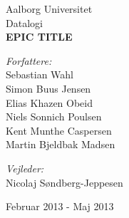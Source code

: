\begin{titlingpage}
\color{fpcolor}
\centering
\vspace*{1.0cm}

\LARGE Aalborg Universitet\\[0.75cm]
\Large Datalogi\\[1.75cm]

\vspace{2.0cm}
{ \fontsize{26.2pt}{26.2pt} \bfseries EPIC TITLE}
\vspace{0.5cm}
\vspace{0.75cm}

\begin{minipage}{13.37cm}
  \begin{flushleft} \large
    \vspace{0pt}
    \emph{Forfattere:}\\
    Sebastian Wahl\\
    Simon Buus Jensen\\
    Elias Khazen Obeid\\
    Niels Sonnich Poulsen\\
    Kent Munthe Caspersen\\
    Martin Bjeldbak Madsen\\
  \end{flushleft}

  \begin{flushright} \large
    \vspace{-112pt}
    \emph{Vejleder:}\\
    Nicolaj Søndberg-Jeppesen
  \end{flushright}
\end{minipage}

\vfill

{\large Februar 2013 - Maj 2013}

\end{titlingpage}
